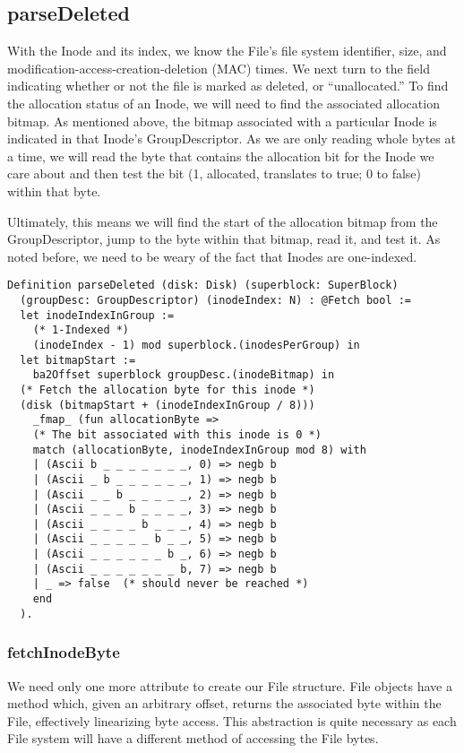 \documentclass[nocopyrightspace]{sigplanconf}
\begin{document}
\subsection{parseDeleted}
With the Inode and its index, we know the File's file system identifier, size,
and modification-access-creation-deletion (MAC) times.  We next turn to the
field indicating whether or not the file is marked as deleted, or
``unallocated.'' To find the allocation status of an Inode, we will need to
find the associated allocation bitmap. As mentioned above, the bitmap
associated with a particular Inode is indicated in that Inode's
GroupDescriptor. As we are only reading whole bytes at a time, we will read
the byte that contains the allocation bit for the Inode we care about and then
test the bit (1, allocated, translates to true; 0 to false) within that byte.

Ultimately, this means we will find the start of the allocation bitmap from
the GroupDescriptor, jump to the byte within that bitmap, read it, and test
it. As noted before, we need to be weary of the fact that Inodes are
one-indexed.

\begin{lstlisting}
Definition parseDeleted (disk: Disk) (superblock: SuperBlock)
  (groupDesc: GroupDescriptor) (inodeIndex: N) : @Fetch bool :=
  let inodeIndexInGroup := 
    (* 1-Indexed *)
    (inodeIndex - 1) mod superblock.(inodesPerGroup) in
  let bitmapStart := 
    ba2Offset superblock groupDesc.(inodeBitmap) in
  (* Fetch the allocation byte for this inode *)
  (disk (bitmapStart + (inodeIndexInGroup / 8))) 
    _fmap_ (fun allocationByte =>
    (* The bit associated with this inode is 0 *)
    match (allocationByte, inodeIndexInGroup mod 8) with
    | (Ascii b _ _ _ _ _ _ _, 0) => negb b
    | (Ascii _ b _ _ _ _ _ _, 1) => negb b
    | (Ascii _ _ b _ _ _ _ _, 2) => negb b
    | (Ascii _ _ _ b _ _ _ _, 3) => negb b
    | (Ascii _ _ _ _ b _ _ _, 4) => negb b
    | (Ascii _ _ _ _ _ b _ _, 5) => negb b
    | (Ascii _ _ _ _ _ _ b _, 6) => negb b
    | (Ascii _ _ _ _ _ _ _ b, 7) => negb b
    | _ => false  (* should never be reached *)
    end
  ).
\end{lstlisting}

\subsubsection{fetchInodeByte}

We need only one more attribute to create our File structure. File objects
have a method which, given an arbitrary offset, returns the associated byte
within the File, effectively linearizing byte access. This abstraction is
quite necessary as each File system will have a different method of accessing
the File bytes.
\end{document}
